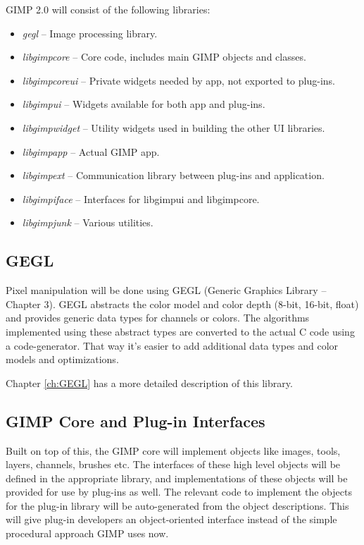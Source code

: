 GIMP 2.0 will consist of the following libraries: 
\begin{itemize}
\item {\em gegl} -- Image processing library. 
\item {\em libgimpcore} -- Core code, includes main GIMP objects and classes.  
\item {\em libgimpcoreui} -- Private widgets needed by app, not exported to plug-ins. 
\item {\em libgimpui} -- Widgets available for both app and plug-ins. 
\item {\em libgimpwidget} -- Utility widgets used in building the other UI libraries. 
\item {\em libgimpapp} -- Actual GIMP app.
\item {\em libgimpext} -- Communication library between plug-ins and application.
\item {\em libgimpiface} -- Interfaces for libgimpui and libgimpcore.
\item {\em libgimpjunk} -- Various utilities. 
\end{itemize}

\subsection{GEGL}

Pixel manipulation will be done using GEGL (Generic Graphics Library -- Chapter
3). GEGL abstracts the color model and color depth (8-bit, 16-bit, float) and
provides generic data types for channels or colors.  The algorithms implemented
using these abstract types are converted to the actual C code using a
code-generator. That way it's easier to add additional data types and color
models and optimizations.

Chapter
\ref{ch:GEGL} has a more detailed description of this library.

\subsection{GIMP Core and Plug-in Interfaces}

Built on top of this, the GIMP core will implement objects like images, tools,
layers, channels, brushes etc. The interfaces of these high level objects will
be defined in the appropriate library, and implementations of these objects
will be provided for use by plug-ins as well. The relevant code to implement
the objects for the plug-in library will be auto-generated from the object
descriptions.  This will give plug-in developers an object-oriented interface
instead of the simple procedural approach GIMP uses now.

